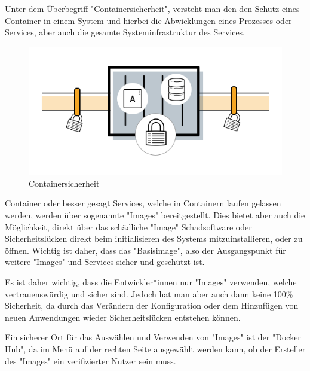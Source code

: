 
Unter dem Überbegriff "Containersicherheit", versteht man den den Schutz eines Container in einem System und hierbei die Abwicklungen eines Prozesses oder Services, aber auch die gesamte Systeminfrastruktur des Services. \cite{ContainerSecurity}

\begin{figure}[H]
    \centering
    \includegraphics[width=\textwidth]{media/DockerAndContainering/Containersicherheit.png}
    \caption{Containersicherheit \cite{ContainerSecurity}}
\end{figure}


Container oder besser gesagt Services, welche in Containern laufen gelassen werden, werden über sogenannte "Images" bereitgestellt. Dies bietet aber auch die Möglichkeit, direkt über das schädliche "Image" Schadsoftware oder Sicherheitslücken direkt beim initialisieren des Systems mitzuinstallieren, oder zu öffnen. Wichtig ist daher, dass das "Basisimage", also der Ausgangspunkt für weitere "Images" und Services sicher und geschützt ist. \cite{ContainerSecurity}

Es ist daher wichtig, dass die Entwickler*innen nur "Images" verwenden, welche vertrauenswürdig und sicher sind. Jedoch hat man aber auch dann keine 100\% Sicherheit, da durch das Verändern der Konfiguration oder dem Hinzufügen von neuen Anwendungen wieder Sicherheitslücken entstehen können. \cite{ContainerSecurity}

Ein sicherer Ort für das Auswählen und Verwenden von "Images" ist der "Docker Hub", da im Menü auf der rechten Seite ausgewählt werden kann, ob der Ersteller des "Images" ein verifizierter Nutzer sein muss. \cite{ContainerSecurity}

